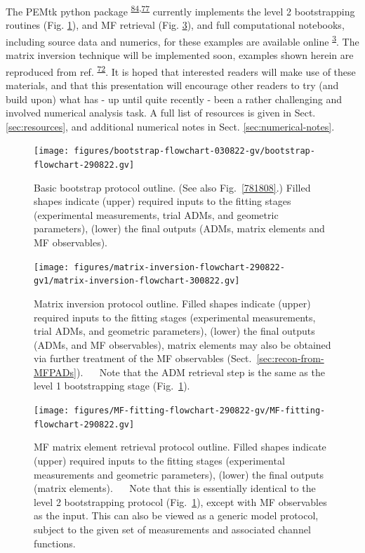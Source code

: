 \documentclass[10pt]{article}
\begin{document}
The PEMtk python package \textsuperscript{\hyperref[csl:84]{84},\hyperref[csl:77]{77}} currently implements the level 2 bootstrapping routines (Fig. \ref{807606}), and MF retrieval (Fig. \ref{671760}), and full computational notebooks, including source data and numerics, for these examples are available online \textsuperscript{\hyperref[csl:3]{3}}. The matrix inversion technique will be implemented soon, examples shown herein are reproduced from ref. \textsuperscript{\hyperref[csl:72]{72}}. It is hoped that interested readers will make use of these materials, and that this presentation will encourage other readers to try (and build upon) what has - up until quite recently - been a rather challenging and involved numerical analysis task. A full list of resources is given in Sect. \ref{sec:resources}, and additional numerical notes in Sect. \ref{sec:numerical-notes}.
\begin{figure}[H]
\begin{center}
\texttt{[image: figures/bootstrap-flowchart-030822-gv/bootstrap-flowchart-290822.gv]}
\caption{{Basic bootstrap protocol outline. (See also
Fig.~{\ref{781808}}.) Filled shapes indicate (upper)
required inputs to the fitting stages (experimental measurements, trial
ADMs, and geometric parameters), (lower) the final outputs (ADMs, matrix
elements and MF observables).
{\label{807606}}%
}}
\end{center}
\end{figure}
\begin{figure}[H]
\begin{center}
\texttt{[image: figures/matrix-inversion-flowchart-290822-gv1/matrix-inversion-flowchart-300822.gv]}
\caption{{Matrix inversion protocol outline. Filled shapes indicate (upper)
required inputs to the fitting stages (experimental measurements, trial
ADMs, and geometric parameters), (lower) the final outputs (ADMs, and MF
observables), matrix elements may also be obtained via further treatment
of the MF observables
(Sect.~{\ref{sec:recon-from-MFPADs}}).~ ~ Note that the
ADM retrieval step is the same as the level 1 bootstrapping stage
(Fig.~{\ref{807606}}).
{\label{731792}}%
}}
\end{center}
\end{figure}
\begin{figure}[H]
\begin{center}
\texttt{[image: figures/MF-fitting-flowchart-290822-gv/MF-fitting-flowchart-290822.gv]}
\caption{{MF matrix element retrieval protocol outline. Filled shapes indicate
(upper) required inputs to the fitting stages (experimental measurements
and geometric parameters), (lower) the final outputs (matrix elements).~
~ Note that this is essentially identical to the level 2 bootstrapping
protocol (Fig.~{\ref{807606}}), except with MF
observables as the input. This can also be viewed as a generic model
protocol, subject to the given set of measurements and associated
channel functions.
{\label{671760}}%
}}
\end{center}
\end{figure}
\end{document}
